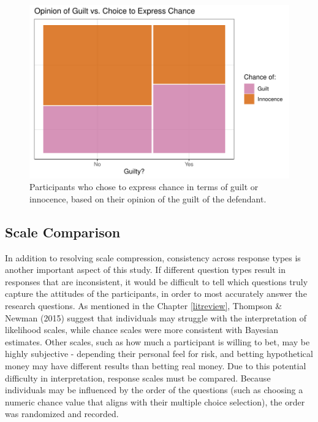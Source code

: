 \documentclass[print]{nuthesis}
\begin{document}
\begin{figure}

{\centering \includegraphics[width=\linewidth]{thesis_files/figure-latex/opinionchanceplot-1} 

}

\caption{Participants who chose to express chance in terms of guilt or innocence, based on their opinion of the guilt of the defendant.}\label{fig:opinionchanceplot}
\end{figure}

\hypertarget{scale-comparison}{%
\subsection{Scale Comparison}\label{scale-comparison}}

In addition to resolving scale compression, consistency across response types is another important aspect of this study.
If different question types result in responses that are inconsistent, it would be difficult to tell which questions truly capture the attitudes of the participants, in order to most accurately answer the research questions.
As mentioned in the Chapter \ref{litreview}, Thompson \& Newman (2015) suggest that individuals may struggle with the interpretation of likelihood scales, while chance scales were more consistent with Bayesian estimates.
Other scales, such as how much a participant is willing to bet, may be highly subjective - depending their personal feel for risk, and betting hypothetical money may have different results than betting real money.
Due to this potential difficulty in interpretation, response scales must be compared.
Because individuals may be influenced by the order of the questions (such as choosing a numeric chance value that aligns with their multiple choice selection), the order was randomized and recorded.
\end{document}
